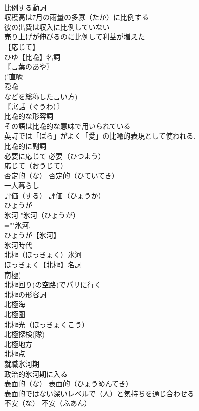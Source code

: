 \documentclass[8pt]{extreport}
\begin{document}
\begin{CJK}{UTF8}{min}
\\	比例する動詞
\\	収穫高は7月の雨量の多寡（たか）に比例する
\\	彼の出費は収入に比例していない
\\	売り上げが伸びるのに比例して利益が増えた
\\	【応じて】
\\	ひゆ【比喩】名詞
\\	〖言葉のあや〗
\\	(!直喩 
\\	隠喩 
\\	などを総称した言い方) 
\\	〖寓話（ぐうわ）〗
\\	比喩的な形容詞
\\	その語は比喩的な意味で用いられている
\\	英詩では「ばら」がよく「愛」の比喩的表現として使われる.
\\	比喩的に副詞
\\	必要に応じて		必要（ひつよう）
\\	応じて（おうじて）
\\	否定的（な）		否定的（ひていてき）
\\	一人暮らし		
\\	評価（する）		評価（ひょうか）
\\	ひょうが
\\	氷河		"氷河（ひょうが）
\\	=""氷河.
\\	ひょうが【氷河】
\\	氷河時代
\\	北極（ほっきょく）氷河
\\	ほっきょく【北極】名詞
\\	南極)
\\	北極回り(の空路)でパリに行く
\\	北極の形容詞
\\	北極海
\\	北極圏
\\	北極光（ほっきょくこう）
\\	北極探検(隊)
\\	北極地方
\\	北極点
\\	就職氷河期
\\	政治的氷河期に入る
\\	表面的（な）		表面的（ひょうめんてき）
\\	表面的ではない深いレベルで（人）と気持ちを通じ合わせる
\\	不安（な）		不安（ふあん）

\end{CJK}
\end{document}
